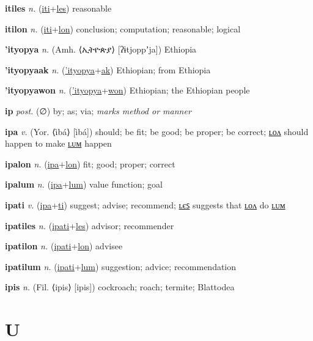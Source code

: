 \textbf{\hypertarget{itiles}{itiles}} \textit{n.} (\hyperlink{iti}{iti}+\allowbreak \hyperlink{les}{les})
reasonable

\textbf{\hypertarget{itilon}{itilon}} \textit{n.} (\hyperlink{iti}{iti}+\allowbreak \hyperlink{lon}{lon})
conclusion; computation; reasonable; logical

\textbf{\hypertarget{'ityopya}{'ityopya}} \textit{n.} (Amh. ⟨{\ethiopic{}ኢትዮጵያ}⟩ [ʔɨtjoppʼja])
Ethiopia

\textbf{\hypertarget{'ityopyaak}{'ityopyaak}} \textit{n.} (\hyperlink{'ityopya}{'ityopya}+\allowbreak \hyperlink{ak}{ak})
Ethiopian; from Ethiopia

\textbf{\hypertarget{'ityopyawon}{'ityopyawon}} \textit{n.} (\hyperlink{'ityopya}{'ityopya}+\allowbreak \hyperlink{won}{won})
Ethiopian; the Ethiopian people

\textbf{\hypertarget{ip}{ip}} \textit{post.} (∅)
by; as; via; \textit{marks method or manner}

\textbf{\hypertarget{ipa}{ipa}} \textit{v.} (Yor. ⟨ìbá⟩ [ìbá])
should; be fit; be good; be proper; be correct; \hyperlink{ipalon}{ʟᴏᴧ} should happen to make \hyperlink{ipalum}{ʟᴜᴍ} happen

\textbf{\hypertarget{ipalon}{ipalon}} \textit{n.} (\hyperlink{ipa}{ipa}+\allowbreak \hyperlink{lon}{lon})
fit; good; proper; correct

\textbf{\hypertarget{ipalum}{ipalum}} \textit{n.} (\hyperlink{ipa}{ipa}+\allowbreak \hyperlink{lum}{lum})
value function; goal

\textbf{\hypertarget{ipati}{ipati}} \textit{v.} (\hyperlink{ipa}{ipa}+\allowbreak \hyperlink{ti}{ti})
suggest; advise; recommend; \hyperlink{ipatiles}{ʟєꜱ} suggests that \hyperlink{ipatilon}{ʟᴏᴧ} do \hyperlink{ipatilum}{ʟᴜᴍ}

\textbf{\hypertarget{ipatiles}{ipatiles}} \textit{n.} (\hyperlink{ipati}{ipati}+\allowbreak \hyperlink{les}{les})
advisor; recommender

\textbf{\hypertarget{ipatilon}{ipatilon}} \textit{n.} (\hyperlink{ipati}{ipati}+\allowbreak \hyperlink{lon}{lon})
advisee

\textbf{\hypertarget{ipatilum}{ipatilum}} \textit{n.} (\hyperlink{ipati}{ipati}+\allowbreak \hyperlink{lum}{lum})
suggestion; advice; recommendation

\textbf{\hypertarget{ipis}{ipis}} \textit{n.} (Fil. ⟨ipis⟩ [ipis])
cockroach; roach; termite; Blattodea

\section{U}

